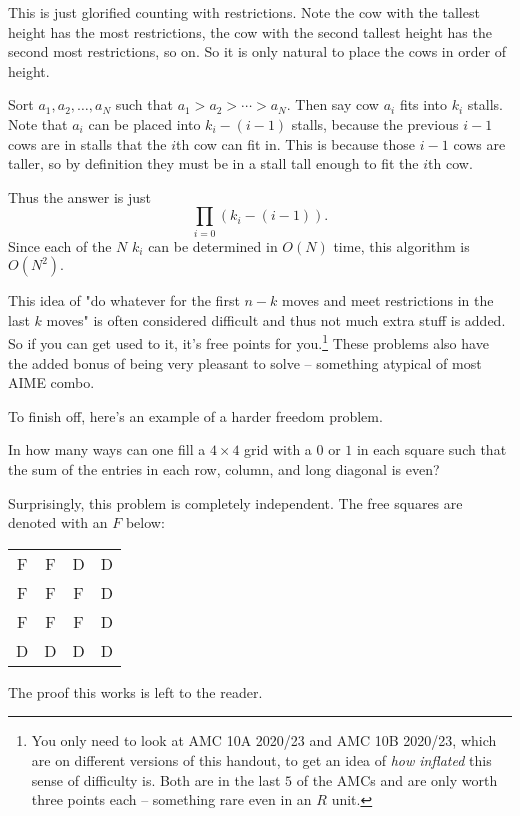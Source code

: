 \begin{sol}
This is just glorified counting with restrictions. Note the cow with the tallest height has the most restrictions, the cow with the second tallest height has the second most restrictions, so on. So it is only natural to place the cows in order of height.

Sort $a_1,a_2,\ldots,a_N$ such that $a_1>a_2>\cdots>a_N.$ Then say cow $a_i$ fits into $k_i$ stalls. Note that $a_i$ can be placed into $k_i-(i-1)$ stalls, because the previous $i-1$ cows are in stalls that the $i$th cow can fit in. This is because those $i-1$ cows are taller, so by definition they must be in a stall tall enough to fit the $i$th cow.

Thus the answer is just
\[\prod_{i=0}(k_i-(i-1)).\]
Since each of the $N$ $k_i$ can be determined in $O(N)$ time, this algorithm is $O(N^2).$
\end{sol}

This idea of "do whatever for the first $n-k$ moves and meet restrictions in the last $k$ moves" is often considered difficult and thus not much extra stuff is added. So if you can get used to it, it's free points for you.\footnote{You only need to look at AMC 10A 2020/23 and AMC 10B 2020/23, which are on different versions of this handout, to get an idea of \textit{how inflated} this sense of difficulty is. Both are in the last $5$ of the AMCs and are only worth three points each -- something rare even in an $R$ unit.} These problems also have the added bonus of being very pleasant to solve -- something atypical of most AIME combo.

To finish off, here's an example of a harder freedom problem.

\begin{exam}
In how many ways can one fill a $4\times 4$ grid with a $0$ or $1$ in each square such that the sum of the entries in each row, column, and long diagonal is even?
\end{exam}

\begin{sol}
Surprisingly, this problem is completely independent. The free squares are denoted with an $F$ below:

\begin{tabular}{c c c c}
F & F & D & D \\
F & F & F & D \\
F & F & F & D \\
D & D & D & D
\end{tabular}

The proof this works is left to the reader.
\end{sol}

